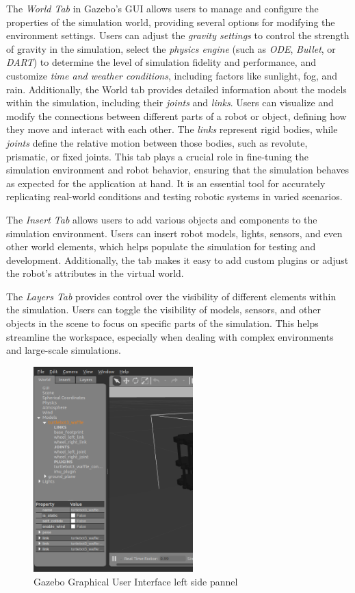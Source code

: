 \documentclass[../../main]{subfiles}
\begin{document}
The \emph{World Tab} in Gazebo’s GUI allows users to manage and configure the 
properties of the simulation world, providing several options for modifying the 
environment settings. Users can adjust the \emph{gravity settings} to control the 
strength of gravity in the simulation, select the \emph{physics engine} (such as 
\emph{ODE}, \emph{Bullet}, or \emph{DART}) to determine the level of simulation 
fidelity and performance, and customize \emph{time and weather conditions}, including 
factors like sunlight, fog, and rain. Additionally, the World tab provides detailed 
information about the models within the simulation, including their \emph{joints} and 
\emph{links}. Users can visualize and modify the connections between different parts 
of a robot or object, defining how they move and interact with each other. The 
\emph{links} represent rigid bodies, while \emph{joints} define the relative motion 
between those bodies, such as revolute, prismatic, or fixed joints. This tab plays a 
crucial role in fine-tuning the simulation environment and robot behavior, ensuring that 
the simulation behaves as expected for the application at hand. It is an essential tool 
for accurately replicating real-world conditions and testing robotic systems in varied 
scenarios.

The \emph{Insert Tab} allows users to add various objects and 
components to the simulation environment. Users can insert robot models, lights, 
sensors, and even other world elements, which helps populate the simulation for 
testing and development. Additionally, the tab makes it easy to add custom plugins 
or adjust the robot's attributes in the virtual world.

The \emph{Layers Tab} provides control over the visibility of 
different elements within the simulation. Users can toggle the visibility of models, 
sensors, and other objects in the scene to focus on specific parts of the simulation. 
This helps streamline the workspace, especially when dealing with complex environments 
and large-scale simulations.

\begin{figure}[H]
    \centering
\includegraphics[width=0.55\textwidth]{fig/gui_left_tab.png}
\caption{Gazebo Graphical User Interface left side pannel}
\label{Left side pannel} %
\end{figure}
\end{document}
